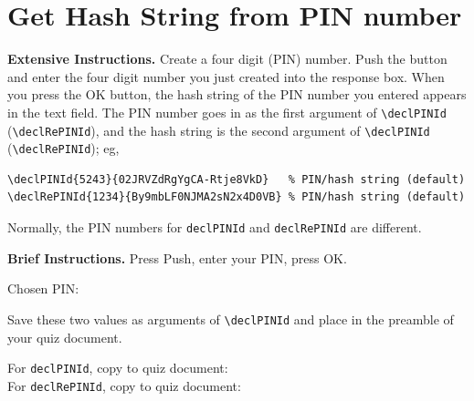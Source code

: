 \documentclass{article}
\def\cs#1{\texttt{\eqbs#1}}
\begin{document}
\section*{Get Hash String from PIN number}

\textbf{Extensive Instructions.} Create a four digit (PIN) number.
Push the button and enter the four digit number you just created into the response box.
When you press the  \textsf{OK} button,
the hash string of the PIN number you entered appears in the text field. The PIN number goes in as the
first argument of \verb|\declPINId| (\verb|\declRePINId|), and the hash string is the second argument of 
\verb|\declPINId| (\verb|\declRePINId|); eg,
\begin{verbatim}
\declPINId{5243}{02JRVZdRgYgCA-Rtje8VkD}   % PIN/hash string (default)
\declRePINId{1234}{By9mbLF0NJMA2sN2x4D0VB} % PIN/hash string (default)
\end{verbatim}
Normally, the PIN numbers for \cs{declPINId} and \cs{declRePINId} are different.\medskip

\textbf{Brief Instructions.} Press \textsf{Push}, enter your PIN, press \textsf{OK}.\medskip\par\noindent
{}\olBdry
{} Chosen PIN: 
\medskip\par\noindent
%
Save these two values as arguments of \verb|\declPINId| and place in the preamble of your
quiz document.\medskip

\noindent
For \cs{declPINId}, copy to quiz document:\\[6pt]\null
  \hspace{15pt}\vcgBdry[6pt]
For \cs{declRePINId}, copy to quiz document:\\[6pt]\null
  \hspace{15pt}\vcgBdry[6pt]
\end{document}
